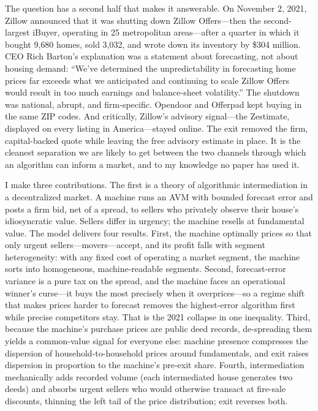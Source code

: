 \documentclass[12pt, letterpaper]{article}
\theoremstyle{remark}
\begin{document}
The question has a second half that makes it answerable. On November 2, 2021, Zillow announced that it was shutting down Zillow Offers---then the second-largest iBuyer, operating in 25 metropolitan areas---after a quarter in which it bought 9{,}680 homes, sold 3{,}032, and wrote down its inventory by \$304 million. CEO Rich Barton's explanation was a statement about forecasting, not about housing demand: ``We've determined the unpredictability in forecasting home prices far exceeds what we anticipated and continuing to scale Zillow Offers would result in too much earnings and balance-sheet volatility.'' The shutdown was national, abrupt, and firm-specific. Opendoor and Offerpad kept buying in the same ZIP codes. And critically, Zillow's advisory signal---the Zestimate, displayed on every listing in America---stayed online. The exit removed the firm, capital-backed quote while leaving the free advisory estimate in place. It is the cleanest separation we are likely to get between the two channels through which an algorithm can inform a market, and to my knowledge no paper has used it.

I make three contributions. The first is a theory of algorithmic intermediation in a decentralized market. A machine runs an AVM with bounded forecast error and posts a firm bid, net of a spread, to sellers who privately observe their house's idiosyncratic value. Sellers differ in urgency; the machine resells at fundamental value. The model delivers four results. First, the machine optimally prices so that only urgent sellers---movers---accept, and its profit falls with segment heterogeneity: with any fixed cost of operating a market segment, the machine sorts into homogeneous, machine-readable segments. Second, forecast-error variance is a pure tax on the spread, and the machine faces an operational winner's curse---it buys the most precisely when it overprices---so a regime shift that makes prices harder to forecast removes the highest-error algorithm first while precise competitors stay. That is the 2021 collapse in one inequality. Third, because the machine's purchase prices are public deed records, de-spreading them yields a common-value signal for everyone else: machine presence compresses the dispersion of household-to-household prices around fundamentals, and exit raises dispersion in proportion to the machine's pre-exit share. Fourth, intermediation mechanically adds recorded volume (each intermediated house generates two deeds) and absorbs urgent sellers who would otherwise transact at fire-sale discounts, thinning the left tail of the price distribution; exit reverses both.
\end{document}

